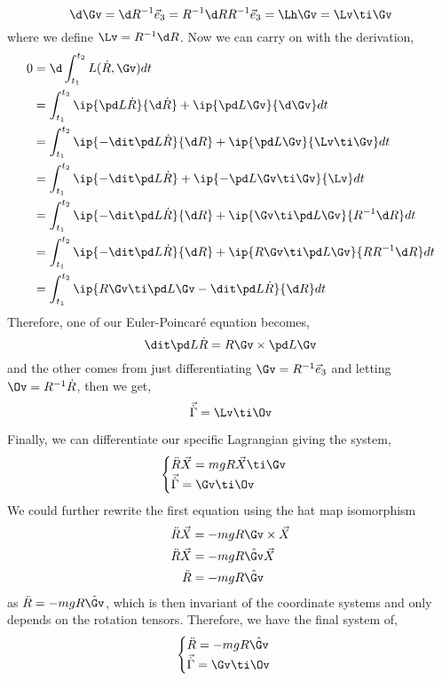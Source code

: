 $$\d\Gv = \d R^{-1}\vec e_3 = R^{-1}\d R R^{-1}\vec e_3 = \Lh\Gv = \Lv \ti \Gv$$
where we define $\Lv = R^{-1}\d R$. Now we can carry on with the derivation,
\begin{align*}
  0 &= \d \int_{t_1}^{t_2} L(\dot R, \Gv) dt\\
  &= \int_{t_1}^{t_2} \ip{\pd L {\dot R}}{\d \dot R} + \ip{\pd L \Gv}{\d\Gv}dt \\
  &= \int_{t_1}^{t_2} \ip{-\dit \pd L {\dot R}}{\d R} + \ip{\pd L \Gv}{\Lv \ti \Gv}dt \\
  &= \int_{t_1}^{t_2} \ip{-\dit \pd L {\dot R}} + \ip{-\pd L \Gv \ti \Gv}{\Lv}dt \\
  &= \int_{t_1}^{t_2} \ip{-\dit \pd L {\dot R}}{\d R} + \ip{\Gv \ti \pd L \Gv}{R^{-1}\d R}dt \\
  &= \int_{t_1}^{t_2} \ip{-\dit \pd L {\dot R}}{\d R} + \ip{R\Gv \ti \pd L \Gv}{RR^{-1}\d R}dt \\
  &= \int_{t_1}^{t_2} \ip{R\Gv \ti \pd L \Gv -\dit \pd L {\dot R}}{\d R} dt \\
\end{align*}
Therefore, one of our Euler-Poincar\'e equation becomes,
$$ \dit \pd L {\dot R} = R\Gv \times \pd L \Gv $$
and the other comes from just differentiating $\Gv = R^{-1}\vec e_3$ and letting $\Ov = R^{-1}\dot R$, then we get,
$$ \vec{\dot \Gamma} = \Lv \ti \Ov $$

\noindent
Finally, we can differentiate our specific Lagrangian giving the system,
$$ \begin{cases}
  \ddot R \vec X = mgR\vec X  \ti \Gv \\
  \vec{\dot \Gamma} = \Gv \ti \Ov
\end{cases} $$
We could further rewrite the first equation using the hat map isomorphism
\begin{align*}
  \ddot R \vec X &= -mgR\Gv\times \vec X\\
  \ddot R \vec X &= -mgR\hat\Gv \vec X\\
  \ddot R &= -mgR\hat\Gv
\end{align*}
as $\ddot R = -mgR\hat\Gv$, which is then invariant of the coordinate systems and only depends on the rotation tensors. Therefore, we have the final system of,
$$ \begin{cases}
  \ddot R = -mgR\hat\Gv \\
  \vec{\dot \Gamma} = \Gv \ti \Ov
\end{cases} $$